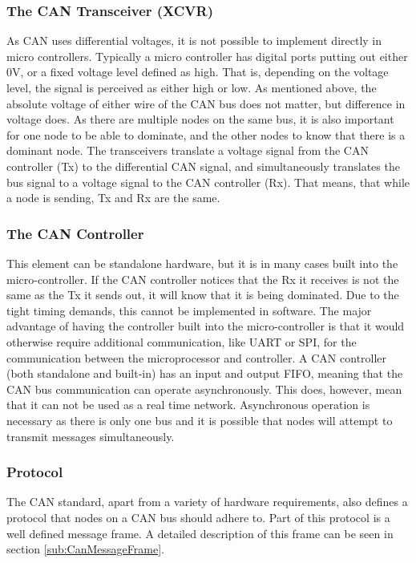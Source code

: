 \subsubsection*{The CAN Transceiver (XCVR)}
As CAN uses differential voltages, it is not possible to implement directly in micro controllers.
Typically a micro controller has digital ports putting out either $ 0 \si{\volt}$, or a fixed voltage level defined as high.
That is, depending on the voltage level, the signal is perceived as either high or low.
As mentioned above, the absolute voltage of either wire of the CAN bus does not matter, but difference in voltage does. 
As there are multiple nodes on the same bus, it is also important for one node to be able to dominate, and the other nodes to know that there is a dominant node.
The transceivers translate a voltage signal from the CAN controller (Tx) to the differential CAN signal, and simultaneously translates the bus signal to a voltage signal to the CAN controller (Rx).
That means, that while a node is sending, Tx and Rx are the same.

\subsubsection*{The CAN Controller}
This element can be standalone hardware, but it is in many cases built into the micro-controller.
If the CAN controller notices that the Rx it receives is not the same as the Tx it sends out, it will know that it is being dominated.
Due to the tight timing demands, this cannot be implemented in software.
The major advantage of having the controller built into the micro-controller is that it would otherwise require additional communication, like UART or SPI, for the communication between the microprocessor and controller.
A CAN controller (both standalone and built-in) has an input and output FIFO, meaning that the CAN bus communication can operate asynchronously.
This does, however, mean that it can not be used as a real time network.
Asynchronous operation is necessary as there is only one bus and it is possible that nodes will attempt to transmit messages simultaneously.

\subsubsection*{Protocol}
The CAN standard, apart from a variety of hardware requirements, also defines a protocol that nodes on a CAN bus should adhere to.
Part of this protocol is a well defined message frame.
A detailed description of this frame can be seen in section \ref{sub:CanMessageFrame}.\\

